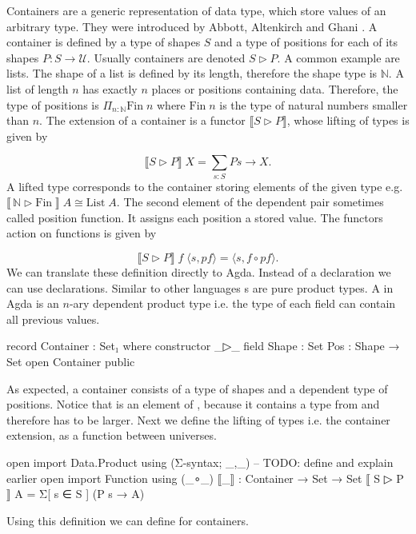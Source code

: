 \documentclass[10pt,a4paper,twoside]{report}
\begin{document}
Containers are a generic representation of data type, which store values of an
arbitrary type.
They were introduced by Abbott, Altenkirch and Ghani
\cite{DBLP:conf/fossacs/AbbottAG03}.
A container is defined by a type of shapes $S$ and a type of positions for each
of its shapes $P : S \rightarrow \mathcal{U}$.
Usually containers are denoted $S \rhd P$.
A common example are lists.
The shape of a list is defined by its length, therefore the shape type is
$\mathbb{N}$.
A list of length $n$ has exactly $n$ places or positions containing data.
Therefore, the type of positions is $\Pi_{n : \mathbb{N}}\mathrm{Fin}\;n$ where
$\mathrm{Fin}\;n$ is the type of natural numbers smaller than $n$.
The extension of a container is a functor $\lBrack S \rhd P \rBrack $,
whose lifting of types is given by

$$
  \lBrack S \rhd P \rBrack\;X = \sum\limits_{s : S} P s \rightarrow X.
$$
A lifted type corresponds to the container storing elements of the given type
e.g. $\lBrack\, \mathbb{N} \rhd \mathrm{Fin}\;\rBrack \; A \cong
\mathrm{List}\;A$.
The second element of the dependent pair sometimes called position function.
It assigns each position a stored value.
The functors action on functions is given by

$$
  \lBrack S \rhd P \rBrack \;f\;\langle s , pf \rangle = \langle s , f \circ pf \rangle.
$$
We can translate these definition directly to Agda.
Instead of a  declaration we can use 
declarations.
Similar to other languages s are pure product types.
A  in Agda is an $n$-ary dependent product type i.e. the
type of each field can contain all previous values.

\begin{code}
record Container : Set₁ where
  constructor _▷_
  field
    Shape : Set
    Pos : Shape → Set
open Container public
\end{code}
As expected, a container consists of a type of shapes and a dependent type of
positions.
Notice that  is an element of ,
because it contains a type from  and therefore has to be
larger.
Next we define the lifting of types i.e. the container extension, as a function
between universes.

\begin{code}
open import Data.Product using (Σ-syntax; _,_) -- TODO: define and explain earlier
open import Function using (_∘_)
⟦_⟧ : Container → Set → Set
⟦ S ▷ P ⟧ A = Σ[ s ∈ S ] (P s → A)
\end{code}
Using this definition we can define  for containers.
\end{document}
